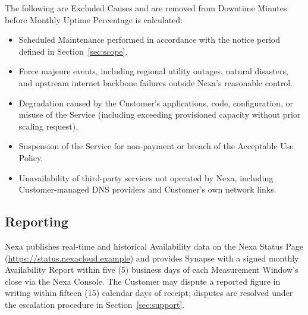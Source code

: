 The following are Excluded Causes and are removed from Downtime Minutes before Monthly
Uptime Percentage is calculated:

\begin{itemize}
  \item Scheduled Maintenance performed in accordance with the notice period defined in
    Section~\ref{sec:scope}.
  \item Force majeure events, including regional utility outages, natural disasters, and
    upstream internet backbone failures outside Nexa's reasonable control.
  \item Degradation caused by the Customer's applications, code, configuration, or
    misuse of the Service (including exceeding provisioned capacity without prior
    scaling request).
  \item Suspension of the Service for non-payment or breach of the Acceptable Use Policy.
  \item Unavailability of third-party services not operated by Nexa, including
    Customer-managed DNS providers and Customer's own network links.
\end{itemize}


\subsection{Reporting}

Nexa publishes real-time and historical Availability data on the Nexa Status Page
(\url{https://status.nexacloud.example}) and provides Synapse with a signed monthly
Availability Report within five (5) business days of each Measurement Window's close via
the Nexa Console. The Customer may dispute a reported figure in writing within fifteen
(15) calendar days of receipt; disputes are resolved under the escalation procedure in
Section~\ref{sec:support}.
